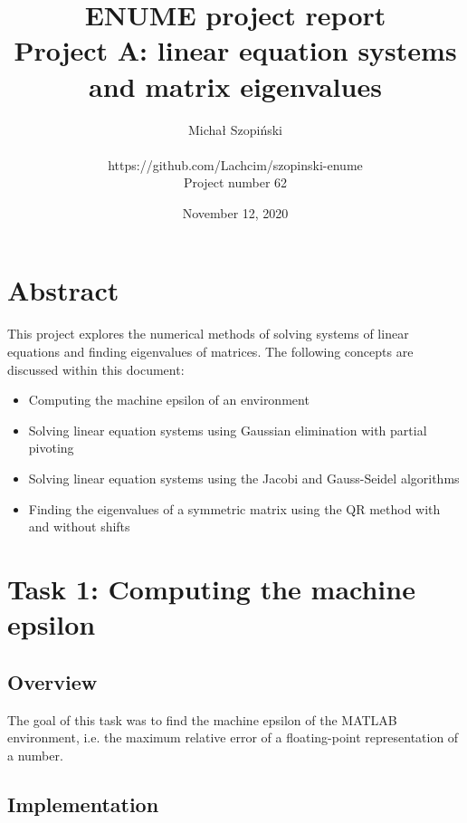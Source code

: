 \documentclass{article}
\begin{document}
	\title{ENUME project report\\Project A: linear equation systems\\and matrix
	eigenvalues}
	\author{Michał Szopiński\\\\
	https://github.com/Lachcim/szopinski-enume\\
	Project number 62}
	\date{November 12, 2020}
	\maketitle
	
	
	\setcounter{section}{-1}
	\section{Abstract}
	
	This project explores the numerical methods of solving systems of linear
	equations and finding eigenvalues of matrices. The following concepts are
	discussed within this document:
	
	\begin{itemize}
		\item Computing the machine epsilon of an environment
		\item Solving linear equation systems using Gaussian elimination with
		partial pivoting
		\item Solving linear equation systems using the Jacobi and Gauss-Seidel
		algorithms
		\item Finding the eigenvalues of a symmetric matrix using the QR method
		with and without shifts
	\end{itemize}
	
	\newpage
	
	\section{Task 1: Computing the machine epsilon}
	
	\subsection{Overview}
	
	The goal of this task was to find the machine epsilon of the MATLAB
	environment, i.e. the maximum relative error of a floating-point
	representation of a number.
	
	\subsection{Implementation}
	
\end{document}
